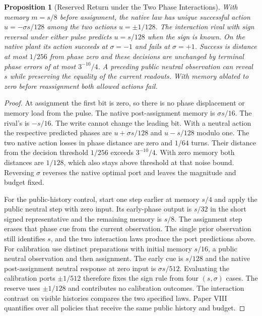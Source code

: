 \documentclass[11pt,a4paper]{article}
\newtheorem{proposition}{Proposition}[section]
\begin{document}
\begin{proposition}[Reserved Return under the Two Phase Interactions]\label{prop:writable-tower-reserved-return}
With memory $m=s/8$ before assignment, the native law has unique successful action $u=-\sigma s/128$ among the two actions $u=\pm1/128$. The interaction rival with sign reversal under either pulse predicts $u=s/128$ when the sign is known. On the native plant its action succeeds at $\sigma=-1$ and fails at $\sigma=+1$. Success is distance at most $1/256$ from phase zero and these decisions are unchanged by terminal phase errors of at most $3^{-10}/4$. A preceding public neutral observation can reveal $s$ while preserving the equality of the current readouts. With memory ablated to zero before reassignment both allowed actions fail.
\end{proposition}
\begin{proof}
At assignment the first bit is zero, so there is no phase displacement or memory load from the pulse. The native post-assignment memory is $\sigma s/16$. The rival's is $-s/16$. The write cannot change the leading bit. With a neutral action the respective predicted phases are $u+\sigma s/128$ and $u-s/128$ modulo one. The two native action losses in phase distance are zero and $1/64$ turns. Their distance from the decision threshold $1/256$ exceeds $3^{-10}/4$. With zero memory both distances are $1/128$, which also stays above threshold at that noise bound. Reversing $\sigma$ reverses the native optimal port and leaves the magnitude and budget fixed.

For the public-history control, start one step earlier at memory $s/4$ and apply the public neutral step with zero input. Its early-phase output is $s/32$ in the short signed representative and the remaining memory is $s/8$. The assignment step erases that phase cue from the current observation. The single prior observation still identifies $s$, and the two interaction laws produce the port predictions above. For calibration use distinct preparations with initial memory $s/16$, a public neutral observation and then assignment. The early cue is $s/128$ and the native post-assignment neutral response at zero input is $\sigma s/512$. Evaluating the calibration ports $\pm1/512$ therefore fixes the sign rule from four $(s,\sigma)$ cases. The reserve uses $\pm1/128$ and contributes no calibration outcomes. The interaction contrast on visible histories compares the two specified laws. Paper VIII quantifies over all policies that receive the same public history and budget.
\end{proof}
\end{document}
